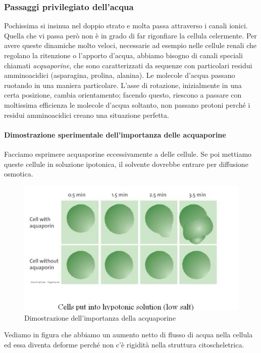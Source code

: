 \documentclass[a4paper,12pt]{article}
\begin{document}
\subsubsection{Passaggi privilegiato dell'acqua}
Pochissima si insinua nel doppio strato e molta passa attraverso i canali ionici. Quella che vi
passa però non è in grado di far rigonfiare la cellula celermente.
Per avere queste dinamiche molto veloci, necessarie ad esempio nelle cellule renali che regolano la ritenzione o l’apporto d’acqua, abbiamo bisogno di canali speciali chiamati \emph{acquaporine}, che sono caratterizzati da sequenze con particolari residui amminoacidici (asparagina, prolina, alanina). Le molecole d'acqua passano ruotando in una maniera particolare. L’asse di rotazione, inizialmente in una certa posizione, cambia orientamento; facendo
questo, riescono a passare con moltissima efficienza le molecole d'acqua soltanto, non
passano protoni perché i residui amminoacidici creano una situazione perfetta.

\paragraph{Dimostrazione sperimentale dell’importanza delle acquaporine}
Facciamo esprimere acquaporine eccessivamente a
delle cellule. Se poi mettiamo queste cellule in soluzione ipotonica, il solvente dovrebbe entrare per diffusione osmotica. 
\begin{figure}[H]
\centering
\includegraphics[scale=0.3]{immagine/acquaporine.jpg}
\caption{Dimostrazione dell'importanza della acquaporine}
\end{figure}
Vediamo in figura che abbiamo un
aumento netto di flusso di acqua nella cellula ed essa
diventa deforme perché non c’è rigidità nella struttura
citoscheletrica. 
\end{document}
